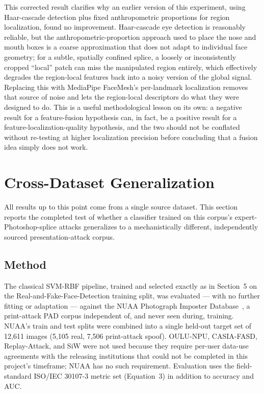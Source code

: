 \documentclass[11pt]{article}
\begin{document}
This corrected result clarifies why an earlier version of this experiment, using Haar-cascade detection plus fixed anthropometric proportions for region localization, found no improvement. Haar-cascade eye detection is reasonably reliable, but the anthropometric-proportion approach used to place the nose and mouth boxes is a coarse approximation that does not adapt to individual face geometry; for a subtle, spatially confined splice, a loosely or inconsistently cropped ``local'' patch can miss the manipulated region entirely, which effectively degrades the region-local features back into a noisy version of the global signal. Replacing this with MediaPipe FaceMesh's per-landmark localization removes that source of noise and lets the region-local descriptors do what they were designed to do. This is a useful methodological lesson on its own: a negative result for a feature-fusion hypothesis can, in fact, be a positive result for a feature-localization-quality hypothesis, and the two should not be conflated without re-testing at higher localization precision before concluding that a fusion idea simply does not work.

\section{Cross-Dataset Generalization}
\label{sec:crossdataset}

All results up to this point come from a single source dataset. This section reports the completed test of whether a classifier trained on this corpus's expert-Photoshop-splice attacks generalizes to a mechanistically different, independently sourced presentation-attack corpus.

\subsection{Method}

The classical SVM-RBF pipeline, trained and selected exactly as in Section~5 on the Real-and-Fake-Face-Detection training split, was evaluated --- with no further fitting or adaptation --- against the NUAA Photograph Imposter Database~\cite{tan2010}, a print-attack PAD corpus independent of, and never seen during, training. NUAA's train and test splits were combined into a single held-out target set of 12,611 images (5,105 real, 7,506 print-attack spoof). OULU-NPU, CASIA-FASD, Replay-Attack, and SiW were not used because they require per-user data-use agreements with the releasing institutions that could not be completed in this project's timeframe; NUAA has no such requirement. Evaluation uses the field-standard ISO/IEC 30107-3 metric set (Equation~3) in addition to accuracy and AUC.
\end{document}
